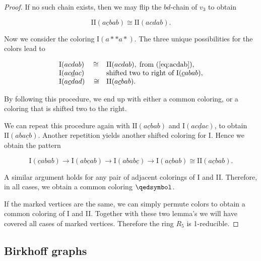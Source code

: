 \begin{proof}
If no such chain exists, then we may flip the $bd$-chain of $v_3$ to obtain

\begin{equation}
    \label{eq:acdab}
    \text{II}(a\underline{c}bab) \cong \text{II}(acdab).
\end{equation}

Now we consider the coloring $\text{I}(a{*}{*}a{*})$. The three unique possibilities for the colors lead to

\begin{equation*}
    \begin{matrix*}[l]
        \text{I}(acdab) \quad\cong& \text{II}(acdab), \;\text{from (\ref{eq:acdab})},\\
        \text{I}(ac\underline{d}ac) \; &\text{shifted two to right of $\text{I}(\underline{c}abab)$}, \\
        \text{I}(a\underline{c}dad) \quad\cong& \text{II}(a\underline{c}bab).
    \end{matrix*}
\end{equation*}

By following this procedure, we end up with either a common coloring, or a coloring that is shifted two to the right.

We can repeat this procedure again with $\text{II}(a\underline{c}bab)$ and $\text{I}(ac\underline{d}ac)$, to obtain $\text{II}(aba\underline{c}b)$. Another repetition yields another shifted coloring for I. Hence we obtain the pattern

\begin{equation}
    \text{I}(\underline{c}abab) \rightarrow \text{I}(ab\underline{c}ab) \rightarrow \text{I}(abab\underline{c}) \rightarrow \text{I}(a\underline{c}bab) \cong \text{II}(a\underline{c}bab).
\end{equation}

A similar argument holds for any pair of adjacent colorings of I and II. Therefore, in all cases, we obtain a common coloring $\qedsymbol$.

\vspace{1em}
If the marked vertices are the same, we can simply permute colors to obtain a common coloring of I and II. Together with these two lemma's we will have covered all cases of marked vertices. Therefore the ring $R_5$ is 1-reducible.

\end{proof}

\subsection{Birkhoff graphs}

